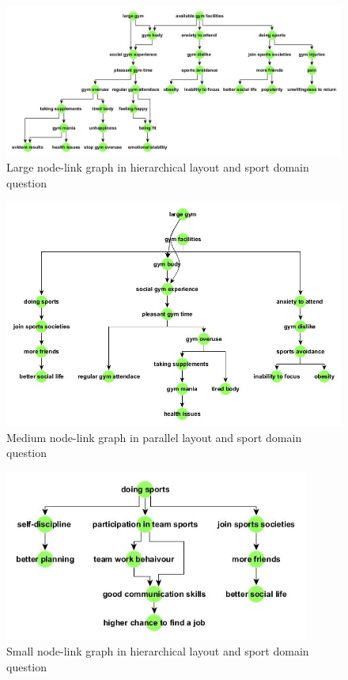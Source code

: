 \documentclass{l4proj}
\begin{document}
\begin{appendices}
\begin{figure}
\centering
\includegraphics[width=19cm]{images/sportLargeHier.jpg}
\caption{Large node-link graph in hierarchical layout and sport domain question}
\label{SportLargeHier}
\end{figure}


\begin{figure}
\centering
\includegraphics[width=16cm]{images/sportMedParallel.jpg}
\caption{Medium node-link graph in parallel layout and sport domain question}
\label{sportMedParallel}
\end{figure}

\begin{figure}[H]
\centering
\includegraphics[width=10cm]{images/sportSmallHier.jpg}
\caption{Small node-link graph in hierarchical layout and sport domain question}
\label{sportSmallHier}
\end{figure}



\end{appendices}
\end{document}
